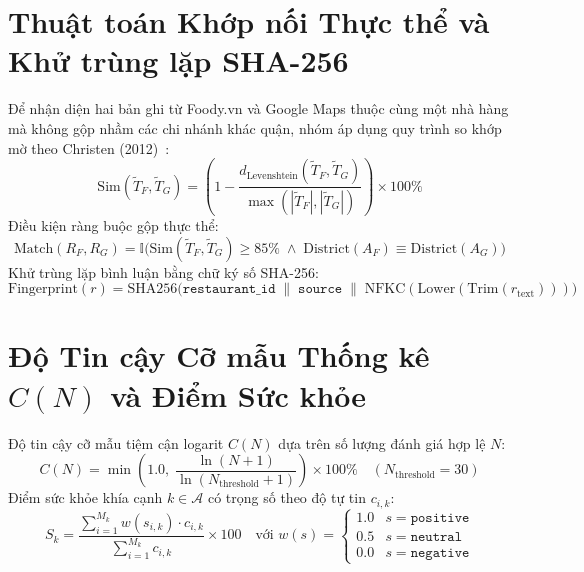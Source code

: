\documentclass[12pt, a4paper, oneside]{book}
\begin{document}
\section{Thuật toán Khớp nối Thực thể và Khử trùng lặp SHA-256}
Để nhận diện hai bản ghi từ Foody.vn và Google Maps thuộc cùng một nhà hàng mà không gộp nhầm các chi nhánh khác quận, nhóm áp dụng quy trình so khớp mờ theo Christen (2012)~\cite{christen2012}:
\begin{equation}
\label{eq:sim}
    \text{Sim}(\tilde{T}_F, \tilde{T}_G) = \left( 1 - \frac{d_{\text{Levenshtein}}(\tilde{T}_F, \tilde{T}_G)}{\max\left(|\tilde{T}_F|, |\tilde{T}_G|\right)} \right) \times 100\%
\end{equation}
Điều kiện ràng buộc gộp thực thể:
\begin{equation}
\label{eq:match}
    \text{Match}(R_F, R_G) = \mathbb{I}\Big( \text{Sim}(\tilde{T}_F, \tilde{T}_G) \ge 85\% \;\wedge\; \text{District}(A_F) \equiv \text{District}(A_G) \Big)
\end{equation}
Khử trùng lặp bình luận bằng chữ ký số SHA-256:
\begin{equation}
\label{eq:fingerprint}
    \text{Fingerprint}(r) = \text{SHA256}\Big( \texttt{restaurant\_id} \;\|\; \texttt{source} \;\|\; \text{NFKC}(\text{Lower}(\text{Trim}(r_{\text{text}}))) \Big)
\end{equation}

\section{Độ Tin cậy Cỡ mẫu Thống kê $C(N)$ và Điểm Sức khỏe}
Độ tin cậy cỡ mẫu tiệm cận logarit $C(N)$ dựa trên số lượng đánh giá hợp lệ $N$:
\begin{equation}
\label{eq:credibility}
    C(N) = \min\left( 1.0,\; \frac{\ln(N + 1)}{\ln(N_{\text{threshold}} + 1)} \right) \times 100\% \quad (N_{\text{threshold}} = 30)
\end{equation}
Điểm sức khỏe khía cạnh $k \in \mathcal{A}$ có trọng số theo độ tự tin $c_{i,k}$:
\begin{equation}
\label{eq:health_score}
    S_k = \frac{\sum_{i=1}^{M_k} w(s_{i,k}) \cdot c_{i,k}}{\sum_{i=1}^{M_k} c_{i,k}} \times 100 \quad \text{với } w(s) = \begin{cases} 1.0 & s = \texttt{positive} \\ 0.5 & s = \texttt{neutral} \\ 0.0 & s = \texttt{negative} \end{cases}
\end{equation}
\end{document}
